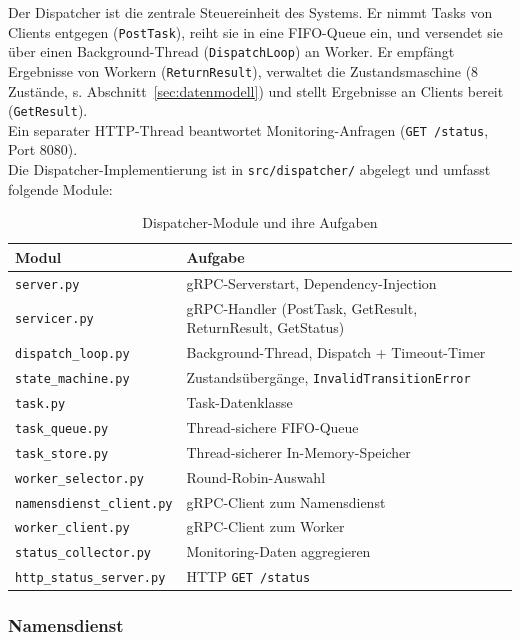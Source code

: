 Der Dispatcher ist die zentrale Steuereinheit des Systems.
Er nimmt Tasks von Clients entgegen (\texttt{PostTask}),
reiht sie in eine FIFO-Queue ein, und versendet sie über einen
Background-Thread (\texttt{DispatchLoop}) an Worker.
Er empfängt Ergebnisse von Workern (\texttt{ReturnResult}),
verwaltet die Zustandsmaschine (8 Zustände, s. Abschnitt~\ref{sec:datenmodell})
und stellt Ergebnisse an Clients bereit (\texttt{GetResult}).
\\
Ein separater HTTP-Thread beantwortet Monitoring-Anfragen
(\texttt{GET /status}, Port 8080).
\\
Die Dispatcher-Implementierung ist in \texttt{src/dispatcher/} abgelegt und
umfasst folgende Module:

\begin{table}[H]
\centering
\begin{tabular}{ll}
\toprule
\textbf{Modul} & \textbf{Aufgabe} \\
\midrule
\texttt{server.py}              & gRPC-Serverstart, Dependency-Injection \\
\texttt{servicer.py}            & gRPC-Handler (PostTask, GetResult, ReturnResult, GetStatus) \\
\texttt{dispatch\_loop.py}      & Background-Thread, Dispatch + Timeout-Timer \\
\texttt{state\_machine.py}      & Zustandsübergänge, \texttt{InvalidTransitionError} \\
\texttt{task.py}                & Task-Datenklasse \\
\texttt{task\_queue.py}         & Thread-sichere FIFO-Queue \\
\texttt{task\_store.py}         & Thread-sicherer In-Memory-Speicher \\
\texttt{worker\_selector.py}    & Round-Robin-Auswahl \\
\texttt{namensdienst\_client.py}& gRPC-Client zum Namensdienst \\
\texttt{worker\_client.py}      & gRPC-Client zum Worker \\
\texttt{status\_collector.py}   & Monitoring-Daten aggregieren \\
\texttt{http\_status\_server.py}& HTTP \texttt{GET /status} \\
\bottomrule
\end{tabular}
\caption{Dispatcher-Module und ihre Aufgaben}
\end{table}

\subsubsection*{Namensdienst}


